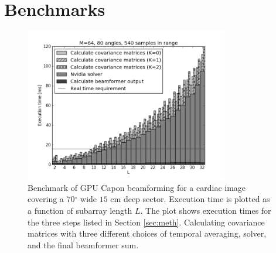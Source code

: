 \documentclass[journal]{IEEEtran}
\newcommand{\degree}{\ensuremath{^\circ}}
\begin{document}
\section{Benchmarks}\label{sec:bench}


\begin{figure}
\centerline{\includegraphics[width=3.5in]{gfx/benchmark_bar_64_80_540.png}}
\caption{Benchmark of GPU Capon beamforming for a cardiac image covering a $70\degree$ wide $15$ cm deep sector. Execution time is plotted as a function of subarray length $L$. The plot shows execution times for the three steps listed in Section \ref{sec:meth}. Calculating covariance matrices with three different choices of temporal averaging, solver, and the final beamformer sum.}
\label{fig:bench}
\end{figure}
\end{document}
